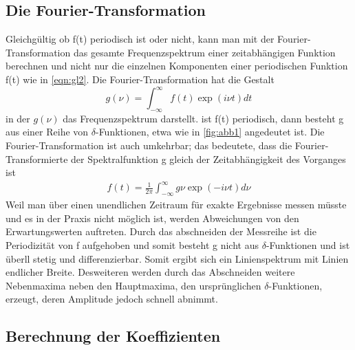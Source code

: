 \subsection{Die Fourier-Transformation}
Gleichgültig ob f(t) periodisch ist oder nicht, kann man mit der Fourier-Transformation das gesamte Frequenzspektrum einer zeitabhängigen Funktion berechnen
und nicht nur die einzelnen Komponenten einer periodischen Funktion f(t) wie in \ref{eqn:gl2}.
Die Fourier-Transformation hat die Gestalt
\begin{equation}
  g(\nu) = \int_{-\infty}^{\infty} f(t) \exp{(i \nu t)} dt \label{eqn:gl3}
\end{equation}
in der $g(\nu)$ das Frequenzspektrum darstellt.
ist f(t) periodisch, dann besteht g aus einer Reihe von $\delta$-Funktionen, etwa wie in \ref{fig:abb1} angedeutet ist.
Die Fourier-Transformation ist auch umkehrbar; das bedeutete, dass die Fourier-Transformierte der Spektralfunktion g gleich der Zeitabhängigkeit des Vorganges ist
\begin{align}
  f(t) = \frac{1}{2 \pi} \int_{-\infty}^{\infty} g{\nu} \exp{(-i \nu t)} d \nu
\end{align}
Weil man über einen unendlichen Zeitraum für exakte Ergebnisse messen müsste und es in der Praxis nicht möglich ist, werden Abweichungen von den Erwartungswerten auftreten.
Durch das abschneiden der Messreihe ist die Periodizität von f aufgehoben und somit besteht g nicht aus $\delta$-Funktionen und ist überll stetig und differenzierbar.
Somit ergibt sich ein Linienspektrum mit Linien endlicher Breite.
Desweiteren werden durch das Abschneiden weitere Nebenmaxima neben den Hauptmaxima, den ursprünglichen $\delta$-Funktionen, erzeugt, deren Amplitude jedoch schnell abnimmt.\cite{AnleitungV351}

\subsection{Berechnung der Koeffizienten}
\label{sec:Koeffizienten}

